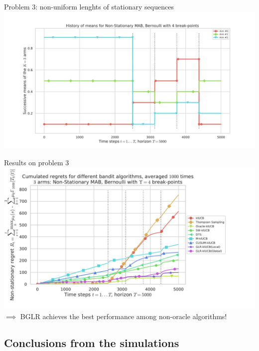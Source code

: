 \documentclass[11pt,english,ignorenonframetext,]{beamer}
\begin{document}
\begin{frame}[plain]{Problem 3: non-uniform lenghts of stationary sequences}
  \centering
  \includegraphics[width=1.15\textwidth]{figures/Problem_4.pdf}
\end{frame}

\begin{frame}[plain]{Results on problem 3}
  \centering
  \includegraphics[width=1.15\textwidth]{figures/regret_problem4.pdf}
  $\implies$ BGLR achieves the best performance among non-oracle algorithms!
\end{frame}


\subsection{\hfill{}Conclusions from the simulations\hfill{}}
\end{document}
